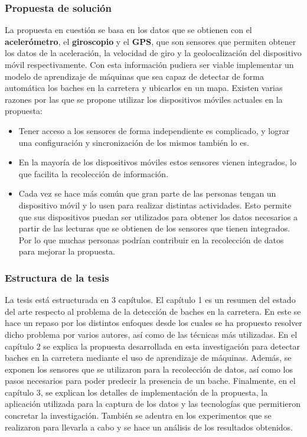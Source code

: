 	\subsubsection*{Propuesta de solución}
		La propuesta en cuestión se basa en los datos que se obtienen con el \textbf{acelerómetro}, el \textbf{giroscopio} y el \textbf{GPS}, que
		son sensores que permiten obtener los datos de la aceleración, la velocidad de giro y la geolocalización del dispositivo móvil respectivamente.
		Con esta información pudiera ser viable implementar un modelo de aprendizaje de máquinas que sea capaz de detectar de forma automática los baches
		en la carretera y ubicarlos en un mapa. Existen varias razones por las que se propone utilizar los dispositivos móviles actuales en la propuesta:\\

		\begin{itemize}
			\item Tener acceso a los sensores de forma independiente es complicado, y lograr una configuración y sincronización de los mismos también lo es.
			\item En la mayoría de los dispositivos móviles estos sensores vienen integrados, lo que facilita la recolección de información.
			\item Cada vez se hace más común que gran parte de las personas tengan un dispositivo móvil y lo usen para realizar distintas actividades.
				Esto permite que sus dispositivos puedan ser utilizados para obtener los datos necesarios a partir de las lecturas que se obtienen de los
				sensores que tienen integrados. Por lo que muchas personas podrían contribuir en la recolección de datos para mejorar la propuesta.
		\end{itemize}

	\subsubsection*{Estructura de la tesis}
		La tesis está estructurada en 3 capítulos. El capítulo 1 es un resumen del estado del arte respecto al problema de la detección de baches en
		la carretera. En este se hace un repaso por los distintos enfoques desde los cuales se ha propuesto resolver dicho problema por varios autores,
		así como de las técnicas más utilizadas. En el capítulo 2 se explica la propuesta desarrollada en esta investigación para detectar baches en la
		carretera mediante el uso de aprendizaje de máquinas. Además, se exponen los sensores que se utilizaron para la recolección de datos, así 
		como los pasos necesarios para poder predecir la presencia de un bache. Finalmente, en el capítulo 3, se explican los detalles 
		de implementación de la propuesta, la aplicación utilizada para la captura de los datos y las tecnologías que permitieron concretar la investigación.
		También se adentra en los experimentos que se realizaron para llevarla  a cabo y se hace un análisis de los resultados obtenidos.
		

